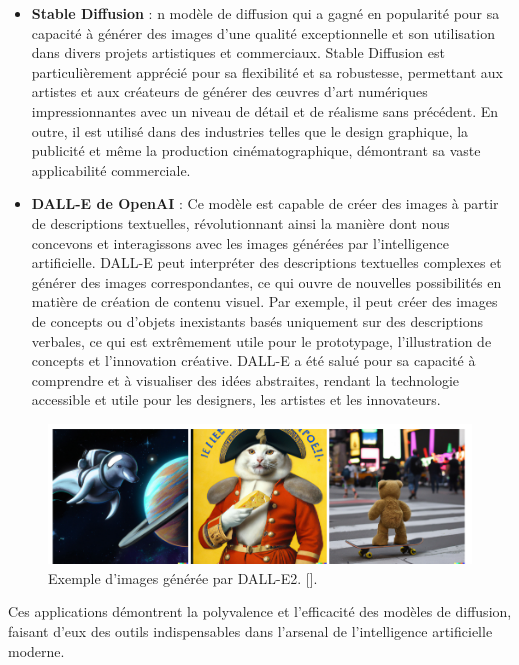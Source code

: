 \begin{itemize}
	\item \textbf{Stable Diffusion} : n modèle de diffusion qui a gagné en popularité pour sa capacité à générer des images d’une qualité exceptionnelle et son utilisation dans divers projets artistiques et commerciaux. Stable Diffusion est particulièrement apprécié pour sa flexibilité et sa robustesse, permettant aux artistes et aux créateurs de générer des œuvres d'art numériques impressionnantes avec un niveau de détail et de réalisme sans précédent. En outre, il est utilisé dans des industries telles que le design graphique, la publicité et même la production cinématographique, démontrant sa vaste applicabilité commerciale.

	\item \textbf{DALL-E de OpenAI} : Ce modèle est capable de créer des images à partir de descriptions textuelles, révolutionnant ainsi la manière dont nous concevons et interagissons avec les images générées par l’intelligence artificielle. DALL-E peut interpréter des descriptions textuelles complexes et générer des images correspondantes, ce qui ouvre de nouvelles possibilités en matière de création de contenu visuel. Par exemple, il peut créer des images de concepts ou d'objets inexistants basés uniquement sur des descriptions verbales, ce qui est extrêmement utile pour le prototypage, l'illustration de concepts et l'innovation créative. DALL-E a été salué pour sa capacité à comprendre et à visualiser des idées abstraites, rendant la technologie accessible et utile pour les designers, les artistes et les innovateurs.
\end{itemize}

\begin{figure}[hbt!]
	\centering
	\includegraphics[width=12cm]{images_pfe/sd_images.png}
	\caption{Exemple d’images générée par DALL-E2. [\cite{ramesh2022hierarchical}].}
	\label{fig:unet}
\end{figure}
\FloatBarrier

Ces applications démontrent la polyvalence et l'efficacité des modèles de
diffusion, faisant d'eux des outils indispensables dans l'arsenal de
l'intelligence artificielle moderne.

